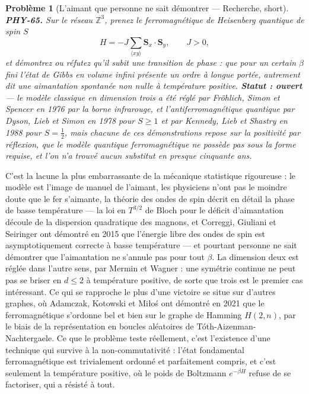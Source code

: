 \documentclass[11pt]{article}
\newtheorem{problem}{Problème}
\begin{document}
\begin{problem}[{L'aimant que personne ne sait démontrer --- Recherche, short}]
\textbf{PHY-65.} Sur le réseau $ \mathbb{Z}^{3} $, prenez le ferromagnétique
de Heisenberg quantique de spin $ S $
\[ H = -J\sum_{\langle xy\rangle} \mathbf{S}_{x}\cdot\mathbf{S}_{y}, \qquad J > 0, \]
et démontrez ou réfutez qu'il subit une transition de phase : que pour un certain $ \beta $ fini
l'état de Gibbs en volume infini présente un ordre à longue portée, autrement dit une aimantation
spontanée non nulle à température positive. \textbf{Statut : ouvert} --- le modèle classique en
dimension trois a été réglé par Fröhlich, Simon et Spencer en 1976 par la borne infrarouge, et
l'\textit{antiferromagnétique} quantique par Dyson, Lieb et Simon en 1978 pour $ S \ge 1 $ et par
Kennedy, Lieb et Shastry en 1988 pour $ S = \tfrac{1}{2} $, mais chacune de ces démonstrations
repose sur la positivité par réflexion, que le modèle quantique ferromagnétique ne possède pas sous
la forme requise, et l'on n'a trouvé aucun substitut en presque cinquante ans.
\end{problem}

\noindent C'est la lacune la plus embarrassante de la mécanique statistique rigoureuse :
le modèle est l'image de manuel de l'aimant, les physiciens n'ont pas le moindre doute que le fer
s'aimante, la théorie des ondes de spin décrit en détail la phase de basse température --- la loi en
$ T^{3/2} $ de Bloch pour le déficit d'aimantation découle de la dispersion quadratique des
magnons, et Correggi, Giuliani et Seiringer ont démontré en 2015 que l'énergie libre des ondes de
spin est asymptotiquement correcte à basse température --- et pourtant personne ne sait démontrer que
l'aimantation ne s'annule pas pour tout $ \beta $. La dimension deux est réglée dans l'autre sens,
par Mermin et Wagner : une symétrie continue ne peut pas se briser en $ d \le 2 $ à température
positive, de sorte que trois est le premier cas intéressant. Ce qui se rapproche le plus d'une
victoire se situe sur d'autres graphes, où Adamczak, Kotowski et Mi\l{}o\'s ont démontré en 2021 que le
ferromagnétique s'ordonne bel et bien sur le graphe de Hamming $ H(2,n) $, par le biais de la
représentation en boucles aléatoires de Tóth-Aizenman-Nachtergaele. Ce que le problème teste
réellement, c'est l'existence d'une technique qui survive à la non-commutativité : l'état
fondamental ferromagnétique est trivialement ordonné et parfaitement compris, et c'est seulement la
température positive, où le poids de Boltzmann $ e^{-\beta H} $ refuse de se factoriser, qui a
résisté à tout.
\end{document}
